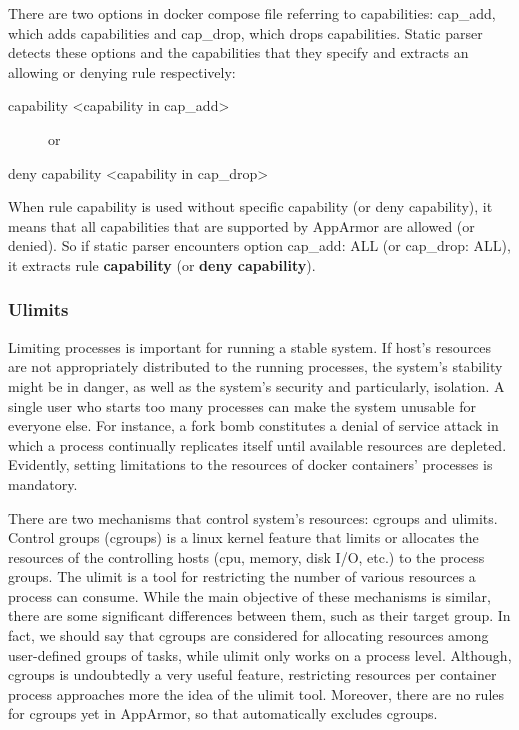 There are two options in docker compose file referring to capabilities: cap\_add, which adds capabilities and cap\_drop, which drops capabilities. Static parser detects these options and the capabilities that they specify and extracts an allowing or denying rule respectively:

\begin{description}
\item[capability \textless capability in cap\_add\textgreater{}] or
\item[deny capability \textless capability in cap\_drop\textgreater{}]
\end{description}

When rule capability is used without specific capability (or deny capability), it means that all capabilities that are supported by AppArmor are allowed (or denied). So if static parser encounters option cap\_add: ALL (or cap\_drop: ALL), it extracts rule \textbf{capability} (or \textbf{deny capability}).

\subsubsection{Ulimits}

Limiting processes is important for running a stable system. If host's resources are not appropriately distributed to the running processes, the system's stability might be in danger, as well as the system's security and particularly, isolation. A single user who starts too many processes can make the system unusable for everyone else. For instance, a fork bomb constitutes a denial of service attack in which a process continually replicates itself until available resources are depleted. Evidently, setting limitations to the resources of docker containers' processes is mandatory.

There are two mechanisms that control system's resources: cgroups and ulimits. Control groups (cgroups) is a linux kernel feature that limits or allocates the resources of the controlling hosts (cpu, memory, disk I/O, etc.) to the process groups. The ulimit is a tool for restricting the number of various resources a process can consume. While the main objective of these mechanisms is similar, there are some significant differences between them, such as their target group. In fact, we should say that cgroups are considered for allocating resources among user-defined groups of tasks, while ulimit only works on a process level. Although, cgroups is undoubtedly a very useful feature, restricting resources per container process approaches more the idea of the ulimit tool. Moreover, there are no rules for cgroups yet in AppArmor, so that automatically excludes cgroups.

